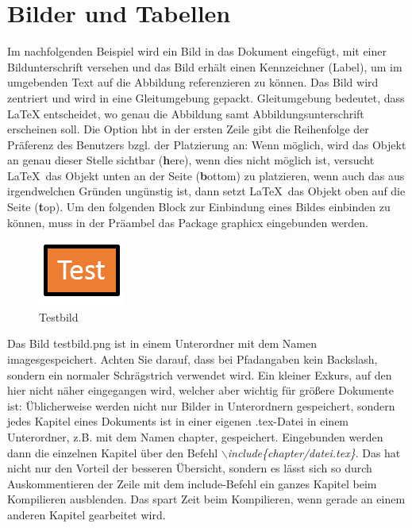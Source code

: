 \documentclass[ngerman,parskip]{scrbook}
\begin{document}
\chapter{Bilder und Tabellen}

Im nachfolgenden Beispiel wird ein Bild in das Dokument eingefügt, mit einer
Bildunterschrift versehen und das Bild erhält einen Kennzeichner (Label), um im
umgebenden Text auf die Abbildung referenzieren zu können. Das Bild wird
zentriert und wird in eine Gleitumgebung gepackt. Gleitumgebung bedeutet, dass
\LaTeX\; entscheidet, wo genau die Abbildung samt Abbildungsunterschrift
erscheinen soll. Die Option \glqq hbt\grqq\; in der ersten Zeile gibt die
Reihenfolge der Präferenz des Benutzers bzgl. der Platzierung an: Wenn möglich,
wird das Objekt an genau dieser Stelle sichtbar (\textbf{h}ere), wenn dies
nicht möglich ist, versucht \LaTeX\, das Objekt unten an der Seite
(\textbf{b}ottom) zu platzieren, wenn auch das aus irgendwelchen Gründen
ungünstig ist, dann setzt \LaTeX\, das Objekt oben auf die Seite
(\textbf{t}op). Um den folgenden Block zur Einbindung eines Bildes einbinden zu
können, muss in der Präambel das Package graphicx eingebunden werden.

\begin{figure}[hbt]
	\centering
	\includegraphics{images/testbild.png}
	\caption{Testbild}
	\label{fig:test_bild_01}
\end{figure}

Das Bild testbild.png ist in einem Unterordner mit dem Namen \glqq
images\grqq\;gespeichert. Achten Sie darauf, dass bei Pfadangaben kein
Backslash, sondern ein normaler Schrägstrich verwendet wird. Ein kleiner
Exkurs, auf den hier nicht näher eingegangen wird, welcher aber wichtig für
größere Dokumente ist: Üblicherweise werden nicht nur Bilder in Unterordnern
gespeichert, sondern jedes Kapitel eines Dokuments ist in einer eigenen
.tex-Datei in einem Unterordner, z.B. mit dem Namen chapter, gespeichert.
Eingebunden werden dann die einzelnen Kapitel über den Befehl
\textit{$\backslash$include\{chapter/datei.tex\}}. Das hat nicht nur den
Vorteil der besseren Übersicht, sondern es lässt sich so durch Auskommentieren
der Zeile mit dem include-Befehl ein ganzes Kapitel beim Kompilieren \glqq
ausblenden\grqq. Das spart Zeit beim Kompilieren, wenn gerade an einem anderen
Kapitel gearbeitet wird.
\end{document}
